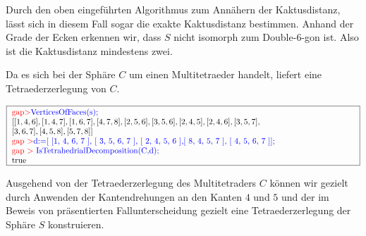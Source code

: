 \documentclass[12pt,titlepage,twoside,cleardoublepage]{article}
\theoremstyle{nummermitklammern}
\numberwithin{equation}{section}
\begin{document}
Durch den oben eingeführten Algorithmus zum Annähern der Kaktusdistanz, lässt sich in diesem Fall sogar die exakte Kaktusdistanz bestimmen. Anhand der Grade der Ecken erkennen wir, dass $S$ nicht isomorph zum Double-6-gon ist. Also ist die Kaktusdistanz mindestens zwei.
\begin{center}
 \end{center}
Da es sich bei der Sphäre $C$ um einen Multitetraeder handelt, liefert  eine Tetraederzerlegung von $C.$
\begin{center}
 $\fbox{
\parbox{15cm}{
\textcolor{red}{gap$>$}\textcolor{blue}{ VerticesOfFaces(s);}\newline 
$[ [ 1, 4, 6 ], [ 1, 4, 7 ], [ 1, 6, 7 ], [ 4, 7, 8 ], [ 2, 5, 6 ],
[ 3, 5, 6 ],[ 2, 4, 5 ], [ 2, 4, 6 ], [ 3, 5, 7 ],$ \newline
$  [ 3, 6, 7 ],
[ 4, 5, 8 ], [ 5, 7, 8 ] ]$\newline
\textcolor{red}{gap $>$}\textcolor{blue}{d:=[ [1, 4, 6, 7 ], [ 3, 5, 6, 7 ], [ 2, 4, 5, 6 ],[ 8, 4, 5, 7 ], [ 4, 5, 6, 7 ]];}\newline
\textcolor{red}{gap $>$} \textcolor{blue}{IsTetrahedrialDecomposition(C,d);}\newline
true
 }}$
 \end{center}
 Ausgehend von der Tetraederzerlegung des Multitetraders $C$ können wir gezielt durch Anwenden der Kantendrehungen an den Kanten $4$ und $5$ und der im Beweis von  präsentierten Fallunterscheidung gezielt eine Tetraederzerlegung der Sphäre $S$ konstruieren.
\end{document}
